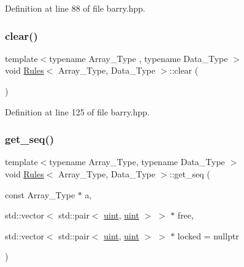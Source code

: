 Definition at line 88 of file barry.\+hpp.

\mbox{\label{classbarry_1_1_rules_a135a15d3ff70d4350d76a15f8e85f7df}} 
\subsubsection{\texorpdfstring{clear()}{clear()}}
{\footnotesize\ttfamily template$<$typename Array\+\_\+\+Type , typename Data\+\_\+\+Type $>$ \\
void \hyperlink{classbarry_1_1_rules}{Rules}$<$ Array\+\_\+\+Type, Data\+\_\+\+Type $>$\+::clear (\begin{DoxyParamCaption}{ }\end{DoxyParamCaption})\hspace{0.3cm}{\ttfamily [inline]}}



Definition at line 125 of file barry.\+hpp.

\mbox{\label{classbarry_1_1_rules_a7b8f29955ec52f49808d7ea1cd4eaf5e}} 
\subsubsection{\texorpdfstring{get\+\_\+seq()}{get\_seq()}}
{\footnotesize\ttfamily template$<$typename Array\+\_\+\+Type, typename Data\+\_\+\+Type $>$ \\
void \hyperlink{classbarry_1_1_rules}{Rules}$<$ Array\+\_\+\+Type, Data\+\_\+\+Type $>$\+::get\+\_\+seq (\begin{DoxyParamCaption}\item[{const Array\+\_\+\+Type $\ast$}]{a,  }\item[{std\+::vector$<$ std\+::pair$<$ \hyperlink{namespacebarry_a11dfc53ddb4672278319aa04f1e09a6c}{uint}, \hyperlink{namespacebarry_a11dfc53ddb4672278319aa04f1e09a6c}{uint} $>$ $>$ $\ast$}]{free,  }\item[{std\+::vector$<$ std\+::pair$<$ \hyperlink{namespacebarry_a11dfc53ddb4672278319aa04f1e09a6c}{uint}, \hyperlink{namespacebarry_a11dfc53ddb4672278319aa04f1e09a6c}{uint} $>$ $>$ $\ast$}]{locked = {\ttfamily nullptr} }\end{DoxyParamCaption})\hspace{0.3cm}{\ttfamily [inline]}}



